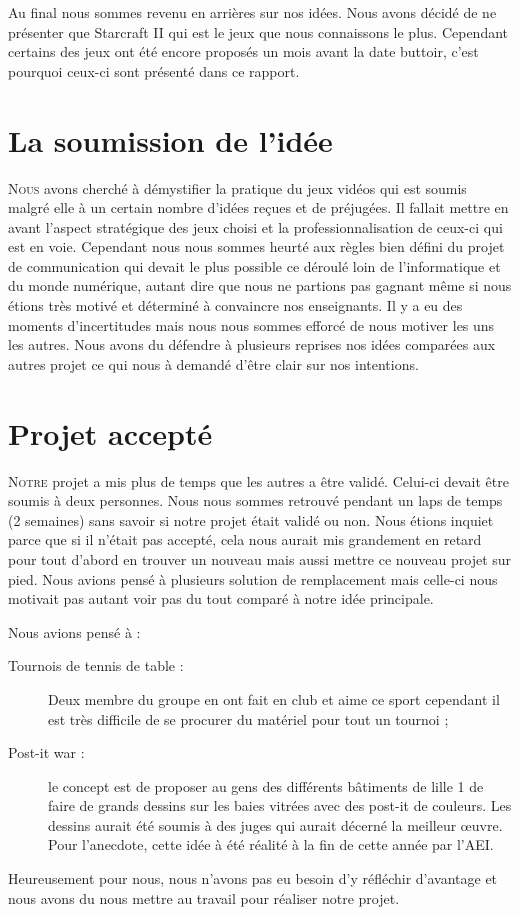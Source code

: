Au final nous sommes revenu en arrières sur nos idées. Nous avons décidé
de ne présenter que Starcraft II qui est le jeux que nous connaissons le
plus. Cependant certains des jeux ont été encore proposés un mois avant
la date buttoir, c'est pourquoi ceux-ci sont présenté dans ce rapport.

\section{La soumission de l'idée}%
\label{sec:la_soumission_de_l_idee}

\lettrine{N}{ous} avons cherché à démystifier la pratique du jeux vidéos
qui est soumis malgré elle à un certain nombre d'idées reçues et de
préjugées.  Il fallait mettre en avant l'aspect stratégique des jeux
choisi et la professionnalisation de ceux-ci qui est en voie. Cependant
nous nous sommes heurté aux règles bien défini du projet de
communication qui devait le plus possible ce déroulé loin de
l'informatique et du monde numérique, autant dire que nous ne partions
pas gagnant même si nous étions très motivé et déterminé à convaincre
nos enseignants. Il y a eu des moments d'incertitudes mais nous nous
sommes efforcé de nous motiver les uns les autres. Nous avons du
défendre à plusieurs reprises nos idées comparées aux autres projet ce
qui nous à demandé d'être clair sur nos intentions.

\section{Projet accepté}%
\label{sec:projet_accepte}

\lettrine{N}{otre} projet a mis plus de temps que les autres a être
validé.  Celui-ci devait être soumis à deux personnes. Nous nous sommes
retrouvé pendant un laps de temps (2 semaines) sans savoir si notre
projet était validé ou non. Nous étions inquiet parce que si il n'était
pas accepté, cela nous aurait mis grandement en retard pour tout d'abord
en trouver un nouveau mais aussi mettre ce nouveau projet sur pied. Nous
avions pensé à plusieurs solution de remplacement mais celle-ci nous
motivait pas autant voir pas du tout comparé à notre idée principale.

Nous avions pensé à :

\begin{description}

\item[Tournois de tennis de table :] Deux membre du groupe en ont fait en
club et aime ce sport cependant il est très difficile de se procurer du
matériel pour tout un tournoi ;

\item[Post-it war :] le concept est de proposer au gens des différents
bâtiments de lille 1 de faire de grands dessins sur les baies vitrées
avec des post-it de couleurs. Les dessins aurait été soumis à des juges
qui aurait décerné la meilleur \oe{}uvre.  Pour l'anecdote, cette idée à
été réalité à la fin de cette année par l'AEI.

\end{description}

Heureusement pour nous, nous n'avons pas eu besoin d'y réfléchir
d'avantage et nous avons du nous mettre au travail pour réaliser notre
projet.


